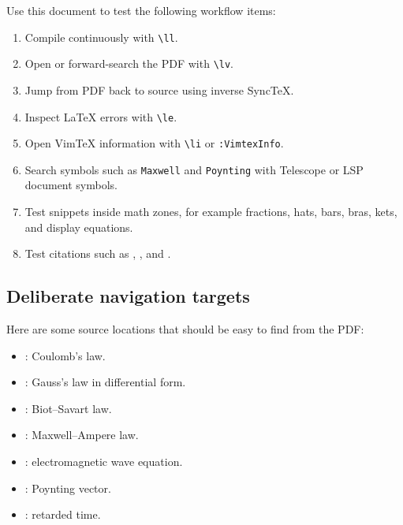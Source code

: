 Use this document to test the following workflow items:
\begin{enumerate}[label=\arabic*.]
  \item Compile continuously with \texttt{\textbackslash ll}.
  \item Open or forward-search the PDF with \texttt{\textbackslash lv}.
  \item Jump from PDF back to source using inverse SyncTeX.
  \item Inspect LaTeX errors with \texttt{\textbackslash le}.
  \item Open VimTeX information with \texttt{\textbackslash li} or \texttt{:VimtexInfo}.
  \item Search symbols such as \texttt{Maxwell} and \texttt{Poynting} with Telescope or LSP document symbols.
  \item Test snippets inside math zones, for example fractions, hats, bars, bras, kets, and display equations.
  \item Test citations such as \cite{griffiths2017}, \cite{purcell2013}, and \cite{jackson1999}.
\end{enumerate}

\subsection{Deliberate navigation targets}

Here are some source locations that should be easy to find from the PDF:
\begin{itemize}
  \item {}: Coulomb's law.
  \item {}: Gauss's law in differential form.
  \item {}: Biot--Savart law.
  \item {}: Maxwell--Ampere law.
  \item {}: electromagnetic wave equation.
  \item {}: Poynting vector.
  \item {}: retarded time.
\end{itemize}

\printbibliography


